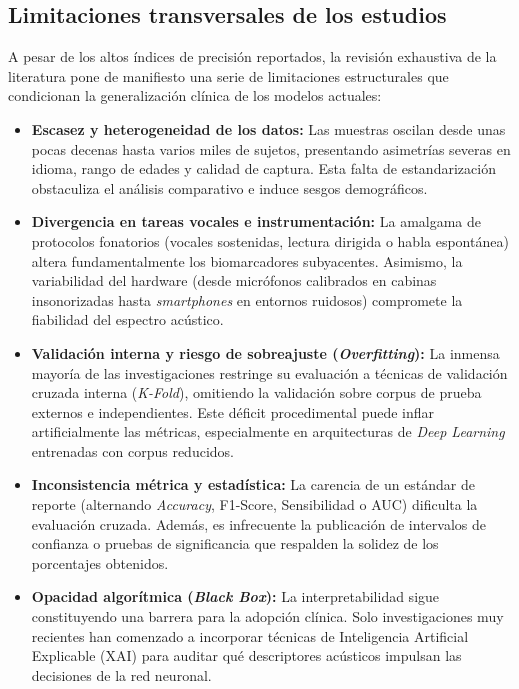 \subsection{Limitaciones transversales de los estudios}
A pesar de los altos índices de precisión reportados, la revisión exhaustiva de la literatura pone de manifiesto una serie de limitaciones estructurales que condicionan la generalización clínica de los modelos actuales:

\begin{itemize}
    \item \textbf{Escasez y heterogeneidad de los datos:} Las muestras oscilan desde unas pocas decenas hasta varios miles de sujetos, presentando asimetrías severas en idioma, rango de edades y calidad de captura. Esta falta de estandarización obstaculiza el análisis comparativo e induce sesgos demográficos.
    
    \item \textbf{Divergencia en tareas vocales e instrumentación:} La amalgama de protocolos fonatorios (vocales sostenidas, lectura dirigida o habla espontánea) altera fundamentalmente los biomarcadores subyacentes. Asimismo, la variabilidad del hardware (desde micrófonos calibrados en cabinas insonorizadas hasta \textit{smartphones} en entornos ruidosos) compromete la fiabilidad del espectro acústico.
    
    \item \textbf{Validación interna y riesgo de sobreajuste (\textit{Overfitting}):} La inmensa mayoría de las investigaciones restringe su evaluación a técnicas de validación cruzada interna (\textit{K-Fold}), omitiendo la validación sobre corpus de prueba externos e independientes. Este déficit procedimental puede inflar artificialmente las métricas, especialmente en arquitecturas de \textit{Deep Learning} entrenadas con corpus reducidos.
    
    \item \textbf{Inconsistencia métrica y estadística:} La carencia de un estándar de reporte (alternando \textit{Accuracy}, F1-Score, Sensibilidad o AUC) dificulta la evaluación cruzada. Además, es infrecuente la publicación de intervalos de confianza o pruebas de significancia que respalden la solidez de los porcentajes obtenidos.
    
    \item \textbf{Opacidad algorítmica (\textit{Black Box}):} La interpretabilidad sigue constituyendo una barrera para la adopción clínica. Solo investigaciones muy recientes \cite{shen2024, muntaha2024} han comenzado a incorporar técnicas de Inteligencia Artificial Explicable (XAI) para auditar qué descriptores acústicos impulsan las decisiones de la red neuronal.
\end{itemize}

